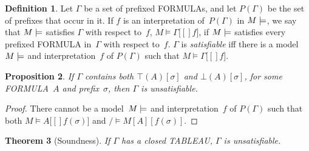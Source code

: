 \documentclass[10pt,a4paper]{article}
\newcommand*{\olup}[1]{\MakeUppercase{#1}}
\theoremstyle{plain}
\newtheorem{thm}{Theorem}[section]
\newtheorem{prop}[thm]{Proposition}
\theoremstyle{definition}
\newtheorem{defn}[thm]{Definition}
\theoremstyle{remark}
\newcommand*{\ollabel}[1]{\label{#1}}
\providecommand{\sFmla}[2]{#1(#2)}
\providecommand{\True}{\top}
\providecommand{\False}{\bot}
\providecommand{\mSat}[3]{\ensuremath{#1 \models #2[#3]}}
\providecommand{\mModel}[2]{\ensuremath{#1 \models #2}}
\begin{document}
\begin{defn}
  Let $\Gamma$ be a set of prefixed \olup{formula}s, and let $P(\Gamma)$
  be the set of prefixes that occur in it. If $f$ is an interpretation
  of~$P(\Gamma)$ in $\mModel{M}$, we say that $\mModel{M}$ satisfies
  $\Gamma$ with respect to~$f$, $\mSat{M}{\Gamma}[f]$, if $\mModel{M}$
  satisfies every prefixed \olup{formula} in~$\Gamma$ with respect
  to~$f$. $\Gamma$ is \emph{satisfiable} iff there is a
  model~$\mModel{M}$ and interpretation~$f$ of $P(\Gamma)$ such that
  $\mSat{M}{\Gamma}[f]$.
\end{defn}

\begin{prop}
  If $\Gamma$ contains both $\sFmla{\True}{A}[\sigma]$ and
  $\sFmla{\False}{A}[\sigma]$, for some \olup{formula}~$A$ and
  prefix~$\sigma$, then $\Gamma$ is unsatisfiable.
\end{prop}

\begin{proof}
  There cannot be a model~$\mModel{M}$ and interpretation~$f$ of
  $P(\Gamma)$ such that both $\mSat{M}{A}[f(\sigma)]$ and
  $\mSat/{M}{A}[f(\sigma)]$.
\end{proof}

\begin{thm}[Soundness]
  \ollabel{thm:tableau-soundness}
  If $\Gamma$ has a closed \olup{tableau}, $\Gamma$ is unsatisfiable.
\end{thm}
\end{document}
